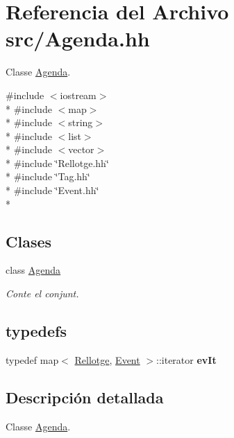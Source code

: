 \hypertarget{_agenda_8hh}{}\section{Referencia del Archivo src/\+Agenda.hh}
\label{_agenda_8hh}


Classe \hyperlink{class_agenda}{Agenda}.  


{\ttfamily \#include $<$iostream$>$}\\*
{\ttfamily \#include $<$map$>$}\\*
{\ttfamily \#include $<$string$>$}\\*
{\ttfamily \#include $<$list$>$}\\*
{\ttfamily \#include $<$vector$>$}\\*
{\ttfamily \#include \char`\"{}Rellotge.\+hh\char`\"{}}\\*
{\ttfamily \#include \char`\"{}Tag.\+hh\char`\"{}}\\*
{\ttfamily \#include \char`\"{}Event.\+hh\char`\"{}}\\*
\subsection*{Clases}
\begin{DoxyCompactItemize}
\item 
class \hyperlink{class_agenda}{Agenda}
\begin{DoxyCompactList}\small\item\em Conte el conjunt. \end{DoxyCompactList}\end{DoxyCompactItemize}
\subsection*{\textquotesingle{}typedefs\textquotesingle{}}
\begin{DoxyCompactItemize}
\item 
\hypertarget{_agenda_8hh_a92fa95d1ca8698cb17d63a303e802338}{}typedef map$<$ \hyperlink{class_rellotge}{Rellotge}, \hyperlink{class_event}{Event} $>$\+::iterator {\bfseries ev\+It}\label{_agenda_8hh_a92fa95d1ca8698cb17d63a303e802338}

\end{DoxyCompactItemize}


\subsection{Descripción detallada}
Classe \hyperlink{class_agenda}{Agenda}. 

